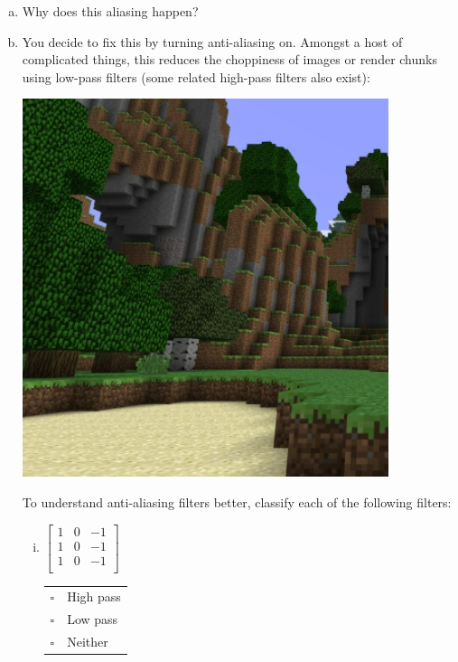 \begin{enumerate}[(a)]
\item Why does this aliasing happen? 


\item
You decide to fix this by turning anti-aliasing on. Amongst a host of complicated things, this reduces the choppiness of images or render chunks using low-pass filters (some related high-pass filters also exist):

\includegraphics[width=\textwidth * 7/10]{images/anti-aliased-minecraft.png}

To understand anti-aliasing filters better, classify each of the following filters:

\begin{enumerate}[(i)]
\item
 $\begin{bmatrix}
    1 & 0 & -1 \\
    1 & 0 & -1 \\
    1 & 0 & -1 \\
 \end{bmatrix}$
\begin{tabular}[h]{ll}
$\square$ & High pass \\
$\square$ & Low pass \\
$\square$ & Neither \\
\end{tabular}


\end{enumerate}
\end{enumerate}
